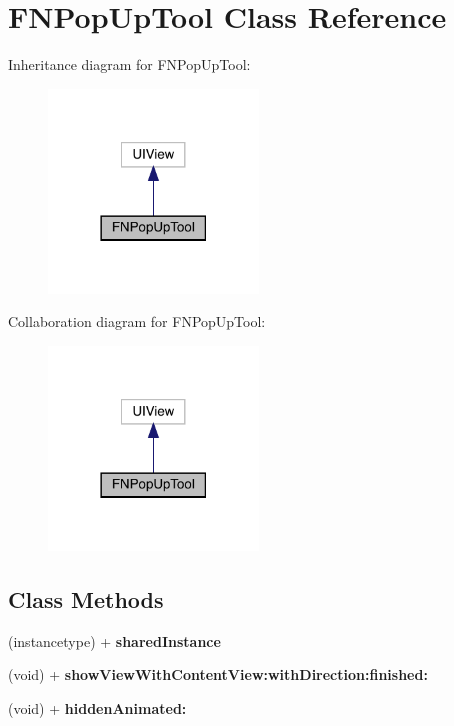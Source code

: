 \hypertarget{interface_f_n_pop_up_tool}{}\section{F\+N\+Pop\+Up\+Tool Class Reference}
\label{interface_f_n_pop_up_tool}


Inheritance diagram for F\+N\+Pop\+Up\+Tool\+:\nopagebreak
\begin{figure}[H]
\begin{center}
\leavevmode
\includegraphics[width=158pt]{interface_f_n_pop_up_tool__inherit__graph}
\end{center}
\end{figure}


Collaboration diagram for F\+N\+Pop\+Up\+Tool\+:\nopagebreak
\begin{figure}[H]
\begin{center}
\leavevmode
\includegraphics[width=158pt]{interface_f_n_pop_up_tool__coll__graph}
\end{center}
\end{figure}
\subsection*{Class Methods}
\begin{DoxyCompactItemize}
\item 
\mbox{\label{interface_f_n_pop_up_tool_aa113bc7d141cd6b8fbc3924713133477}} 
(instancetype) + {\bfseries shared\+Instance}
\item 
\mbox{\label{interface_f_n_pop_up_tool_af531b739da08f64b29bc416346dc9d35}} 
(void) + {\bfseries show\+View\+With\+Content\+View\+:with\+Direction\+:finished\+:}
\item 
\mbox{\label{interface_f_n_pop_up_tool_a6e8479eba4cade3242abfba4172f617c}} 
(void) + {\bfseries hidden\+Animated\+:}
\end{DoxyCompactItemize}
